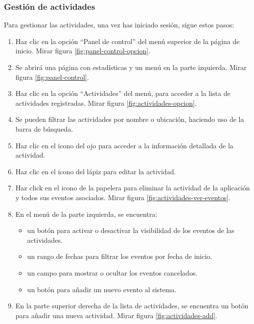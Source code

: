 \subsubsection{Gestión de actividades}
Para gestionar las actividades, una vez has iniciado sesión, sigue estos pasos:
\begin{enumerate}
	\item Haz clic en la opción “Panel de control” del menú superior de la página de inicio. Mirar figura \ref{fig:panel-control-opcion}.
	\item Se abrirá una página con estadísticas y un menú en la parte izquierda. Mirar figura \ref{fig:panel-control}.
	\item Haz clic en la opción “Actividades” del menú, para acceder a la lista de actividades registradas. Mirar figura \ref{fig:actividades-opcion}.
	\item Se pueden filtrar las actividades por nombre o ubicación, haciendo uso de la barra de búsqueda.
	\item Haz clic en el icono del ojo para acceder a la información detallada de la actividad.
	\item Haz clic en el icono del lápiz para editar la actividad.
	\item Haz click en el icono de la papelera para eliminar la actividad de la aplicación y todos sus eventos asociados. Mirar figura \ref{fig:actividades-ver-eventos}.
	\item En el menú de la parte izquierda, se encuentra:
	      \begin{itemize}
		      \item un botón para activar o desactivar la visibilidad de los eventos de las actividades.
		      \item un rango de fechas para filtrar los eventos por fecha de inicio.
		      \item un campo para mostrar o ocultar los eventos cancelados.
		      \item un botón para añadir un nuevo evento al sistema.
	      \end{itemize}
	\item En la parte superior derecha de la lista de actividades, se encuentra un botón para añadir una nueva actividad. Mirar figura \ref{fig:actividades-add}.
\end{enumerate}

